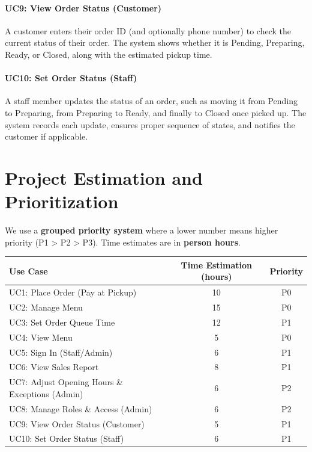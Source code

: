 \documentclass{article}
\begin{document}
\paragraph{UC9: View Order Status (Customer)}  
A customer enters their order ID (and optionally phone number) to check the current status of their order. The system shows whether it is Pending, Preparing, Ready, or Closed, along with the estimated pickup time.

\paragraph{UC10: Set Order Status (Staff)}  
A staff member updates the status of an order, such as moving it from Pending to Preparing, from Preparing to Ready, and finally to Closed once picked up. The system records each update, ensures proper sequence of states, and notifies the customer if applicable.

\section{Project Estimation and Prioritization}

We use a \textbf{grouped priority system} where a lower number means higher priority (P1 > P2 > P3).
Time estimates are in \textbf{person hours}.
\begin{center}
\begin{adjustbox}{max width=\textwidth}
\begin{tabular}{|l|c|c|}
\hline
\textbf{Use Case} & \textbf{Time Estimation (hours)} & \textbf{Priority} \\ \hline
UC1: Place Order (Pay at Pickup)                 & 10 & P0 \\ \hline
UC2: Manage Menu                                 & 15 & P0 \\ \hline
UC3: Set Order Queue Time                        & 12 & P1 \\ \hline
UC4: View Menu                                   & 5  & P0 \\ \hline
UC5: Sign In (Staff/Admin)                       & 6  & P1 \\ \hline
UC6: View Sales Report                           & 8  & P1 \\ \hline
UC7: Adjust Opening Hours \& Exceptions (Admin)  & 6  & P2 \\ \hline
UC8: Manage Roles \& Access (Admin)              & 6  & P2 \\ \hline
UC9: View Order Status (Customer)                & 5  & P1 \\ \hline
UC10: Set Order Status (Staff)                   & 6  & P1 \\ \hline
\end{tabular}
\end{adjustbox}
\end{center}
\end{document}
